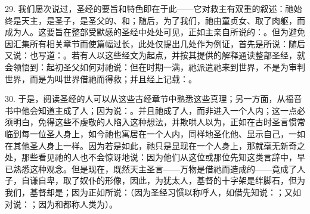 29. 我们屡次说过，圣经的要旨和特色即在于此——它对救主有双重的叙述：祂始终是天主，是圣子，是圣父的、和；随后，为了我们，祂由童贞女、取了肉躯，而成为人。这要旨在整部受默感的圣经中处处可见，正如主亲自所说的：。但为避免因汇集所有相关章节而使篇幅过长，此处仅提出几处作为例证，首先是所说：随后又说：也写道：。若有人以这些经文为起点，并按其提供的解释通读整部圣经，就会领悟到：起初圣父如何对祂说：但在时期一满，祂派遣祂来到世界，不是为审判世界，而是为叫世界借祂而得救；并且经上记载：。\par

30. 于是，阅读圣经的人可以从这些古经章节中熟悉这些真理；另一方面，从福音书中他会知道主成了人；因为说：。并且祂成了人，而非进入一个人内；这一点必须明白，免得这些不虔敬的人陷入这种想法，并欺哄人以为，正如在古时圣言惯常临到每一位圣人身上，如今祂也寓居在一个人内，同样地圣化他、显示自己，一如在其他圣人身上一样。因为若是如此，祂只是显现在一个人身上，那就毫无新奇之处，那些看见祂的人也不会惊讶地说：因为他们从这位或那位先知这类言辞中，早已熟悉这种观念。但是现在，既然天主圣言——万物是借祂而造成的——竟成了人子，自谦自卑，取了奴仆的形像，因此，为犹太人，基督的十字架是绊脚石，但为我们，基督却是；因为正如所说：（因为圣经习惯以称呼人，如借先知说：；又如对说：；因为和都称人类为）。\par

